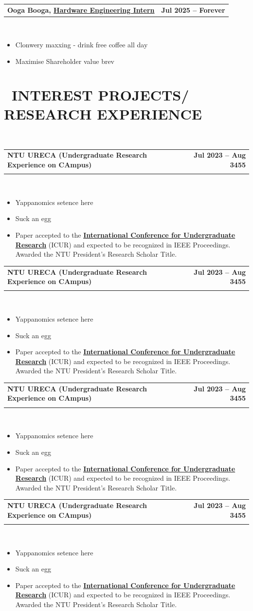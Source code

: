 \documentclass[10pt,a4paper]{article}
\makeatletter
\newcommand{\cvsectionfontsize}{13}
\newcommand{\cvtaglinefirstfontsize}{12}
\newcommand{\cvtaglinesecondfontsize}{12}
\newcommand{\cvbulletfontsize}{11}
\newcommand{\cvsection}[3][.9em]{
  \vspace{-2.7em}
  \section[#3]{\textbf{\scalebox{.68}{\faIcon{#2}}~\fontsize{\cvsectionfontsize}{\cvsectionfontsize}\selectfont\MakeUppercase{#3}}}
  \vspace{-1.8em}
  \noindent\makebox[\textwidth]{\rule{\textwidth}{0.4pt}}
  \\
  \vspace{#1}
}
\newcommand{\cvtagline}[5][1em]{
  \vspace{-0.8em}
  \noindent\begin{tabularx}{\textwidth}{@{}Xr@{}}
    {\fontsize{\cvtaglinefirstfontsize}{\cvtaglinefirstfontsize}\selectfont\textbf{#2}} & 
    {\fontsize{\cvtaglinefirstfontsize}{\cvtaglinefirstfontsize}\selectfont\textbf{#3}} \\
    \vspace{-0.7em}
    {\fontsize{\cvtaglinesecondfontsize}{\cvtaglinesecondfontsize}\selectfont{#4}} & 
    {\fontsize{\cvtaglinesecondfontsize}{\cvtaglinesecondfontsize}\selectfont\textit{#5}} \\
  \end{tabularx}
  \\
  \vspace{0.5em}
}
\newcommand{\cvsingletagline}[3][0.5em]{
  \vspace{-1em}
  \noindent\begin{tabularx}{\textwidth}{@{}Xr}
    {\fontsize{\cvtaglinefirstfontsize}{\cvtaglinefirstfontsize}\selectfont\textbf{#2}} & 
    {\fontsize{\cvtaglinefirstfontsize}{\cvtaglinefirstfontsize}\selectfont\textbf{#3}} \\
  \end{tabularx}
  \\
  \vspace{#1}
}
\newcommand{\cvbullets}[2][1em]{
  \vspace{-1.8em}
  {\fontsize{\cvbulletfontsize}{\cvbulletfontsize}\selectfont
  \color{cvgray}
    \begin{itemize}[left=0pt,labelsep=0.25em, rightmargin=2.5em]
      \setlength\itemsep{0em}
      \setlength\labelwidth{0.1em}
      \setlength\parskip{0pt}
      \setlength{\baselineskip}{1.35\baselineskip}
      
      #2
    \end{itemize}
  }
  \vspace{#1}
}
\makeatother
\begin{document}
\cvsingletagline{Ooga Booga, \underline{Hardware Engineering Intern}}{Jul 2025 – Forever}
\cvbullets{
  \item  Clonwery maxxing - drink free coffee all day
  \item  Maximise Shareholder value brev
}


\cvsection{code}{Interest Projects/ Research Experience}

\cvtagline{NTU URECA (Undergraduate Research Experience on CAmpus)}{Jul 2023 – Aug 3455}{URECA Project: \textbf{\textit{Deep Learning on your Mom}}}{}
\cvbullets{
  \item  {Yappanomics setence here}
  \item {Suck an egg}
  \item Paper accepted to the \textbf{\underline{ International Conference for Undergraduate Research}} (ICUR) and expected to be recognized in IEEE Proceedings. Awarded the NTU President's Research Scholar Title.
}

\cvtagline{NTU URECA (Undergraduate Research Experience on CAmpus)}{Jul 2023 – Aug 3455}{URECA Project: \textbf{\textit{Deep Learning on your Mom}}}{}
\cvbullets{
  \item  {Yappanomics setence here}
  \item {Suck an egg}
  \item Paper accepted to the \textbf{\underline{ International Conference for Undergraduate Research}} (ICUR) and expected to be recognized in IEEE Proceedings. Awarded the NTU President's Research Scholar Title.
}

\cvtagline{NTU URECA (Undergraduate Research Experience on CAmpus)}{Jul 2023 – Aug 3455}{URECA Project: \textbf{\textit{Deep Learning on your Mom}}}{}
\cvbullets{
  \item  {Yappanomics setence here}
  \item {Suck an egg}
  \item Paper accepted to the \textbf{\underline{ International Conference for Undergraduate Research}} (ICUR) and expected to be recognized in IEEE Proceedings. Awarded the NTU President's Research Scholar Title.
}

 \cvtagline{NTU URECA (Undergraduate Research Experience on CAmpus)}{Jul 2023 – Aug 3455}{URECA Project: \textbf{\textit{Deep Learning on your Mom}}}{}
\cvbullets{
  \item  {Yappanomics setence here}
  \item {Suck an egg}
  \item Paper accepted to the \textbf{\underline{ International Conference for Undergraduate Research}} (ICUR) and expected to be recognized in IEEE Proceedings. Awarded the NTU President's Research Scholar Title.
}
\end{document}
